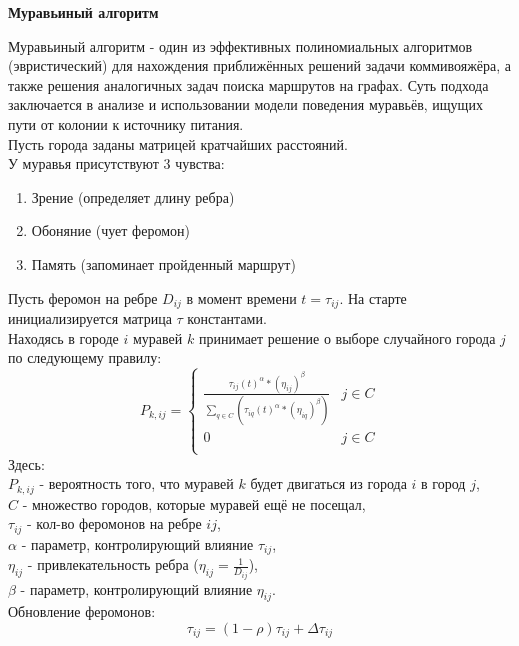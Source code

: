 \documentclass[a4paper,12pt]{article}
\begin{document}
\begin{center}
\textbf{Муравьиный алгоритм}
\end{center}
Муравьиный алгоритм - один из эффективных полиномиальных алгоритмов (эвристический) для нахождения приближённых решений задачи коммивояжёра, а также решения аналогичных задач поиска маршрутов на графах. Суть подхода заключается в анализе и использовании модели поведения муравьёв, ищущих пути от колонии к источнику питания.\\
Пусть города заданы матрицей кратчайших расстояний.\\
У муравья присутствуют 3 чувства:
\begin{enumerate}
\item Зрение (определяет длину ребра)
\item Обоняние (чует феромон)
\item Память (запоминает пройденный маршрут)
\end{enumerate}
Пусть феромон на ребре $D_{ij}$ в момент времени $t = \tau_{ij}$. На старте инициализируется матрица $\tau$ константами.\\
Находясь в городе $i$ муравей $k$  принимает решение о выборе случайного города $j$ по следующему правилу:\\
\begin{equation}\label{equations:equation1}
P_{k,ij} = \left\{
\begin{array}{ll}
\frac{\tau_{ij}(t)^\alpha * (\eta_{ij})^\beta}{\sum_{q \in C}(\tau_{iq}(t)^\alpha * (\eta_{iq})^\beta)} & j \in C \\
0 & j \in C \\
\end{array}
\right.
\end{equation}
Здесь:\\
$P_{k,ij}$ - вероятность того, что муравей $k$ будет двигаться из города $i$ в город $j$,\\
$C$ - множество городов, которые муравей ещё не посещал,\\
$\tau_{ij}$ - кол-во феромонов на ребре $ij$,\\
$\alpha$ - параметр, контролирующий влияние $\tau_{ij}$,\\
$\eta_{ij}$ - привлекательность ребра ($\eta_{ij} = \frac{1}{D_{ij}}$),\\
$\beta$ - параметр, контролирующий влияние $\eta_{ij}$.\\
Обновление феромонов:\\
\begin{equation}\label{equations:equation2}
\tau_{ij} = (1 - \rho)\tau_{ij} + \Delta\tau_{ij}
\end{equation}
\end{document}
